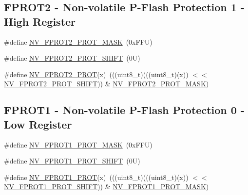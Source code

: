 \subsection*{F\+P\+R\+O\+T2 -\/ Non-\/volatile P-\/\+Flash Protection 1 -\/ High Register}
\begin{DoxyCompactItemize}
\item 
\#define \mbox{\hyperlink{group___n_v___register___masks_ga99b7ccf89e4d3cc80d0317086202de0f}{N\+V\+\_\+\+F\+P\+R\+O\+T2\+\_\+\+P\+R\+O\+T\+\_\+\+M\+A\+SK}}~(0x\+F\+F\+U)
\item 
\#define \mbox{\hyperlink{group___n_v___register___masks_ga50f9336b86839704ca20297b040c3ca5}{N\+V\+\_\+\+F\+P\+R\+O\+T2\+\_\+\+P\+R\+O\+T\+\_\+\+S\+H\+I\+FT}}~(0\+U)
\item 
\#define \mbox{\hyperlink{group___n_v___register___masks_ga3361ca8560d8cdf09a1efcc0b83950fe}{N\+V\+\_\+\+F\+P\+R\+O\+T2\+\_\+\+P\+R\+OT}}(x)~(((uint8\+\_\+t)(((uint8\+\_\+t)(x)) $<$$<$ \mbox{\hyperlink{group___n_v___register___masks_ga50f9336b86839704ca20297b040c3ca5}{N\+V\+\_\+\+F\+P\+R\+O\+T2\+\_\+\+P\+R\+O\+T\+\_\+\+S\+H\+I\+FT}})) \& \mbox{\hyperlink{group___n_v___register___masks_ga99b7ccf89e4d3cc80d0317086202de0f}{N\+V\+\_\+\+F\+P\+R\+O\+T2\+\_\+\+P\+R\+O\+T\+\_\+\+M\+A\+SK}})
\end{DoxyCompactItemize}
\subsection*{F\+P\+R\+O\+T1 -\/ Non-\/volatile P-\/\+Flash Protection 0 -\/ Low Register}
\begin{DoxyCompactItemize}
\item 
\#define \mbox{\hyperlink{group___n_v___register___masks_ga4ca39bad3b57769cb423f1616c985e38}{N\+V\+\_\+\+F\+P\+R\+O\+T1\+\_\+\+P\+R\+O\+T\+\_\+\+M\+A\+SK}}~(0x\+F\+F\+U)
\item 
\#define \mbox{\hyperlink{group___n_v___register___masks_ga06d0cb2797f243b77d60cfecedfc9f86}{N\+V\+\_\+\+F\+P\+R\+O\+T1\+\_\+\+P\+R\+O\+T\+\_\+\+S\+H\+I\+FT}}~(0\+U)
\item 
\#define \mbox{\hyperlink{group___n_v___register___masks_ga04b1531f415057befbd26a0bad3bd7e6}{N\+V\+\_\+\+F\+P\+R\+O\+T1\+\_\+\+P\+R\+OT}}(x)~(((uint8\+\_\+t)(((uint8\+\_\+t)(x)) $<$$<$ \mbox{\hyperlink{group___n_v___register___masks_ga06d0cb2797f243b77d60cfecedfc9f86}{N\+V\+\_\+\+F\+P\+R\+O\+T1\+\_\+\+P\+R\+O\+T\+\_\+\+S\+H\+I\+FT}})) \& \mbox{\hyperlink{group___n_v___register___masks_ga4ca39bad3b57769cb423f1616c985e38}{N\+V\+\_\+\+F\+P\+R\+O\+T1\+\_\+\+P\+R\+O\+T\+\_\+\+M\+A\+SK}})
\end{DoxyCompactItemize}
